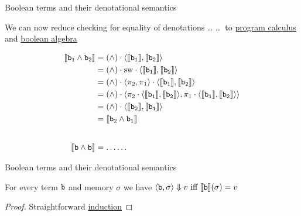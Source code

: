 \documentclass{beamer}
\begin{document}
\begin{frame}{Boolean terms and their denotational semantics}
        
        We can now reduce checking for equality of denotations \dots
        \dots\ to \alert{\underline{program calculus}} and \alert{\underline{boolean algebra}}

        \pause
        \begin{align*}
                \llbracket \mathtt{b_1} \wedge \mathtt{b_2} \rrbracket & =
                (\wedge) \cdot \langle \llbracket \mathtt{b_1} \rrbracket, \llbracket \mathtt{b_2} \rrbracket \rangle
                \\
                                                   & = (\wedge) \cdot \mathrm{sw}
                                                   \cdot 
                                                   \langle \llbracket \mathtt{b_1} \rrbracket, \llbracket \mathtt{b_2} \rrbracket \rangle
                                                   \\
                                                   & = (\wedge) \cdot \langle \pi_2, \pi_1 \rangle
                                                   \cdot 
                                                   \langle \llbracket \mathtt{b_1} \rrbracket, \llbracket \mathtt{b_2} \rrbracket \rangle
                                                   \\
                                                   & = (\wedge) \cdot \langle \pi_2
                                                   \cdot \langle \llbracket \mathtt{b_1} \rrbracket, 
                                                   \llbracket \mathtt{b_2} \rrbracket \rangle, \pi_1
                                                   \cdot \langle \llbracket \mathtt{b_1} \rrbracket, \llbracket \mathtt{b_2} \rrbracket \rangle \rangle
                                                   \\
                                                   & = (\wedge) \cdot 
                                                   \langle \llbracket \mathtt{b_2} \rrbracket, \llbracket \mathtt{b_1} \rrbracket \rangle
                                                   \\
                                                   & = \llbracket \mathtt{b_2} \wedge \mathtt{b_1} \rrbracket
                                                   \\[20pt]
              \llbracket \mathtt{b} \wedge \mathtt{b} \rrbracket & = \dots \dots
        \end{align*}
\end{frame}

\begin{frame}{Boolean terms and their denotational semantics}

        \begin{theorem}
                For every term $\mathtt{b}$ and memory $\sigma$ we
                have 
                $\langle \mathtt{b}, \sigma \rangle \Downarrow v \text{ iff }
                \llbracket \mathtt{b} \rrbracket(\sigma) = v$
        \end{theorem}

        \begin{proof}
                Straightforward \alert{\underline{induction}}
        \end{proof}
\end{frame}
\end{document}
